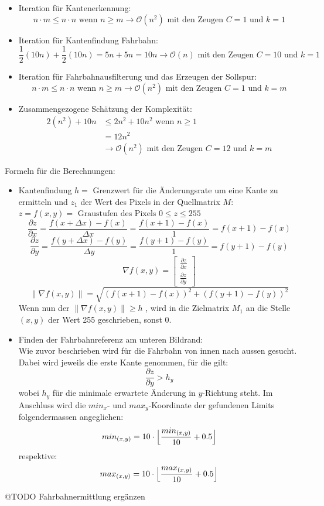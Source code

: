 \begin{itemize}
\item Iteration für Kantenerkennung:
\[
n \cdot m \leq n \cdot n \text{ wenn } n\geq m \rightarrow \mathcal{O}(n^2) \text{ mit den Zeugen }C=1 \text{ und } k = 1
\]
\item Iteration für Kantenfindung Fahrbahn:
\[
\frac{1}{2}(10n) + \frac{1}{2}(10n) = 5n + 5n = 10n \rightarrow \mathcal{O}(n) \text{ mit den Zeugen }C=10 \text{ und } k = 1
\]
\item Iteration für Fahrbahnausfilterung und das Erzeugen der Sollspur:
\[
n \cdot m \leq n \cdot n \text{ wenn } n\geq m \rightarrow \mathcal{O}(n^2) \text{ mit den Zeugen }C=1 \text{ und } k = m
\]
\item Zusammengezogene Schätzung der Komplexität:
\begin{align*}
2(n^2) + 10n &\leq 2n^2 + 10n^2 \text{ wenn } n\geq 1\\
             &= 12n^2\\
             &\rightarrow \mathcal{O}(n^2) \text{ mit den Zeugen }C=12 \text{ und } k = m
\end{align*}
\end{itemize}
Formeln für die Berechnungen:
\begin{itemize}
\item Kantenfindung $h=$ Grenzwert für die Änderungsrate um eine Kante zu ermitteln und $z_1$ der Wert des Pixels in der Quellmatrix $M$:
$z = f(x,y) = \text{ Graustufen des Pixels }0 \leq z \leq 255$\\
\[
\frac{\partial{z}}{\partial{x}}=\frac{f(x+\Delta{x})-f(x)}{\Delta{x}} = \frac{f(x+1)-f(x)}{1} = f(x+1)-f(x)
\]
\[
\frac{\partial{z}}{\partial{y}}=\frac{f(y+\Delta{x})-f(y)}{\Delta{y}} = \frac{f(y+1)-f(y)}{1} = f(y+1)-f(y)
\]
\[
\nabla f(x,y) = \begin{bmatrix}
\frac{\partial{z}}{\partial{x}}\\
\frac{\partial{z}}{\partial{y}}
\end{bmatrix}
\]
\[
\lVert\nabla f(x,y)\rVert = \sqrt{(f(x+1)-f(x))^2 + (f(y+1) - f(y))^2}
\]
Wenn nun der $\lVert\nabla f(x,y)\rVert \geq h$ , wird in die Zielmatrix $M_1$ an die Stelle $(x,y)$ der Wert 255 geschrieben, sonst 0.
\item Finden der Fahrbahnreferenz am unteren Bildrand:\\
Wie zuvor beschrieben wird für die Fahrbahn von innen nach aussen gesucht. Dabei wird jeweils die erste Kante genommen, für die gilt:
\[
\frac{\partial{z}}{\partial{y}} > h_y
\]
wobei $h_y$ für die minimale erwartete Änderung in $y$-Richtung steht. Im Anschluss wird die $min_x$- und $max_y$-Koordinate der gefundenen Limits folgendermassen angeglichen:
\[
min_{(x,y)} = 10\cdot\Bigl\lfloor\frac{min_{(x,y)}}{10}+0.5\Bigr\rfloor
\]
respektive:
\[
max_{(x,y)} = 10\cdot\Bigl\lfloor\frac{max_{(x,y)}}{10}+0.5\Bigr\rfloor
\]
\end{itemize}
@TODO Fahrbahnermittlung ergänzen

